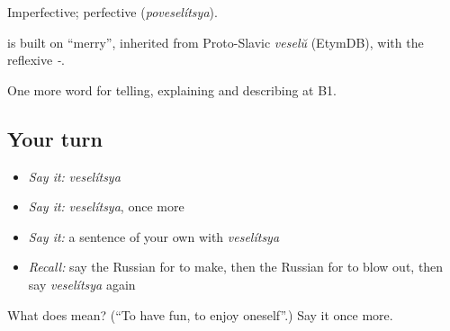 Imperfective; perfective \emph{} (\emph{poveselítsya}).

\begin{cousinweb}
\emph{} is built on \emph{} \textquotedblleft{}merry\textquotedblright{}, inherited from Proto-Slavic \emph{veselŭ} (EtymDB), with the reflexive \emph{-}.
\end{cousinweb}

\begin{grammarlens}[title={What you've built}]
One more word for telling, explaining and describing at B1.
\end{grammarlens}

\subsection*{Your turn}
\begin{itemize}
\raggedright
  \item \emph{Say it:} \emph{veselítsya}
  \item \emph{Say it:} \emph{veselítsya}, once more
  \item \emph{Say it:} a sentence of your own with \emph{veselítsya}
  \item \emph{Recall:} say the Russian for to make, then the Russian for to blow out, then say \emph{veselítsya} again
\end{itemize}

\begin{tcolorbox}[breakable,colback=teal!4,colframe=teal!35!black,title={Before you move on}]
What does  mean? (\textquotedblleft{}To have fun, to enjoy oneself\textquotedblright{}.) Say it once more.
\end{tcolorbox}
